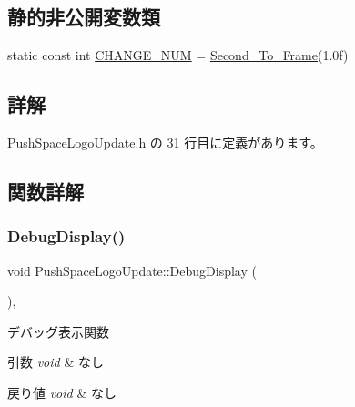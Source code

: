 \subsection*{静的非公開変数類}
\begin{DoxyCompactItemize}
\item 
static const int \mbox{\hyperlink{class_push_space_logo_update_a19a827951aba3490bd1fa2d78252838a}{C\+H\+A\+N\+G\+E\+\_\+\+N\+UM}} = \mbox{\hyperlink{_time_to_frame_8h_acce6a90aebf40509e02a2c7c6cc3dc3d}{Second\+\_\+\+To\+\_\+\+Frame}}(1.\+0f)
\end{DoxyCompactItemize}


\subsection{詳解}


 Push\+Space\+Logo\+Update.\+h の 31 行目に定義があります。



\subsection{関数詳解}
\mbox{\label{class_push_space_logo_update_ab18a0c905455da17f9e2f1fe5f0c34e6}} 
\subsubsection{\texorpdfstring{Debug\+Display()}{DebugDisplay()}}
{\footnotesize\ttfamily void Push\+Space\+Logo\+Update\+::\+Debug\+Display (\begin{DoxyParamCaption}{ }\end{DoxyParamCaption})\hspace{0.3cm}{\ttfamily [override]}, {\ttfamily [virtual]}}



デバッグ表示関数 


\begin{DoxyParams}{引数}
{\em void} & なし \\
\hline
\end{DoxyParams}

\begin{DoxyRetVals}{戻り値}
{\em void} & なし \\
\hline
\end{DoxyRetVals}


